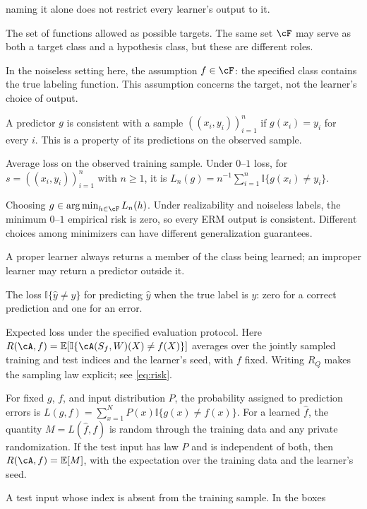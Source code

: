 \documentclass[11pt,twoside]{article}
\newcommand{\I}{\mathbb I}
\theoremstyle{definition}
\theoremstyle{remark}
\begin{document}
\begin{description}[style=nextline,leftmargin=1.5em,labelindent=0pt]
naming it alone does not restrict every learner's output to it.
\item[Target class]
The set of functions allowed as possible targets. The same set $\cF$ may
serve as both a target class and a hypothesis class, but these are different
roles.
\item[Realizability]
In the noiseless setting here, the assumption $f\in\cF$: the specified
class contains the true labeling function. This assumption concerns the
target, not the learner's choice of output.
\item[Consistency]
A predictor $g$ is consistent with a sample $((x_i,y_i))_{i=1}^n$ if
$g(x_i)=y_i$ for every $i$. This is a property of its predictions on the
observed sample.
\item[Empirical risk]
Average loss on the observed training sample. Under $0$--$1$ loss, for
$s=((x_i,y_i))_{i=1}^n$ with $n\ge1$, it is
$L_n(g)=n^{-1}\sum_{i=1}^n\I\{g(x_i)\ne y_i\}$.
\item[Empirical risk minimization (ERM)]
Choosing $g\in\operatorname*{arg\,min}_{h\in\cF}L_n(h)$.
Under realizability and noiseless labels, the minimum $0$--$1$ empirical
risk is zero, so every ERM output is consistent. Different choices among
minimizers can have different generalization guarantees.
\item[Proper; improper learning]
A proper learner always returns a member of the class being learned; an
improper learner may return a predictor outside it.
\item[$0$--$1$ loss]
The loss $\I\{\widehat y\ne y\}$ for predicting $\widehat y$ when the
true label is $y$: zero for a correct prediction and one for an error.
\item[Risk]
Expected loss under the specified evaluation protocol. Here
$R(\cA,f)=\mathbb E[\I\{\cA(S_f,W)(X)\ne f(X)\}]$ averages over the
jointly sampled training and test indices and the learner's seed, with $f$
fixed. Writing $R_Q$ makes the sampling law explicit; see \cref{eq:risk}.
\item[Error mass]
For fixed $g$, $f$, and input distribution $P$, the probability assigned
to prediction errors is
$L(g,f)=\sum_{x=1}^N P(x)\I\{g(x)\ne f(x)\}$.
For a learned $\widehat f$, the quantity $M=L(\widehat f,f)$ is random
through the training data and any private randomization. If the test input
has law $P$ and is independent of both, then
$R(\cA,f)=\mathbb E[M]$, with the expectation over the training data and
the learner's seed.
\item[Unseen input]
A test input whose index is absent from the training sample. In the boxes

\end{description}
\end{document}
